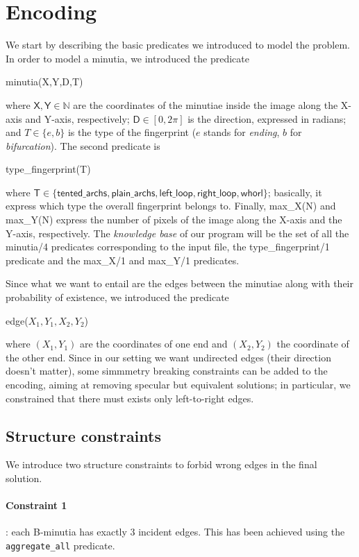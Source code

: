 \documentclass[8pt]{article}
\begin{document}
\section{Encoding}
\label{sec:encoding}
We start by describing the basic predicates we introduced to model
the problem. In order to model a minutia, we introduced the predicate
  \begin{center}
    \textsf{minutia(X,Y,D,T)}
  \end{center}
where $\textsf{X},\textsf{Y} \in \mathbb{N}$ are the coordinates of the minutiae 
inside the image along the X-axis and Y-axis, respectively;
$\textsf{D} \in [0,2\pi]$ is the direction, expressed in radians; 
and $T \in \{e,b\}$ is the type of the fingerprint ($e$ stands for
\emph{ending}, $b$ for \emph{bifurcation}).
The second predicate is
  \begin{center}
    \textsf{type\_fingerprint(T)}
  \end{center}
where $\textsf{T}\in\{
  \textsf{tented\_archs},
  \textsf{plain\_archs},
  \textsf{left\_loop},
  \textsf{right\_loop},
  \textsf{whorl}
\}$; 
basically, it express which type the overall fingerprint belongs to.
Finally, \textsf{max\_X(N)} and \textsf{max\_Y(N)} express the number
of pixels of the image along the X-axis and the Y-axis, respectively.
The \emph{knowledge base} of our program will be the set of all the 
\textsf{minutia/4} predicates corresponding to the input file,
the \textsf{type\_fingerprint/1} predicate and the \textsf{max\_X/1}
and \textsf{max\_Y/1} predicates.

Since what we want to entail are the edges between the minutiae along
with their probability of existence, we introduced the predicate
  \begin{center}
    \textsf{edge($X_1,Y_1,X_2,Y_2$)}
  \end{center}
where $(X_1,Y_1)$ are the coordinates of one end and $(X_2,Y_2)$
the coordinate of the other end.
Since in our setting we want undirected edges (their direction doesn't
matter), some simmmetry breaking constraints can be added to the 
encoding, aiming at removing specular but equivalent solutions; in
particular, we constrained that there must exists only left-to-right
edges.

\subsection{Structure constraints}
We introduce two structure constraints to forbid wrong edges
in the final solution.
\paragraph{Constraint 1}:
each B-minutia has exactly $3$ incident edges. This has been achieved
using the \texttt{aggregate\_all} predicate.
\end{document}
